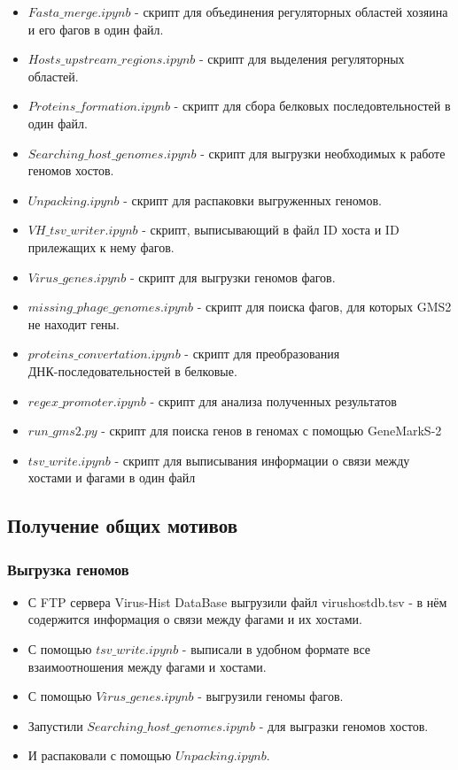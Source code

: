 \documentclass[14pt]{extarticle}
\begin{document}
\begin{itemize}
    \item \(Fasta\_merge.ipynb\) - скрипт для объединения регуляторных областей хозяина и его фагов в один файл.
    \item \(Hosts\_upstream\_regions.ipynb\) - скрипт для выделения регуляторных областей.
    \item \(Proteins\_formation.ipynb\) - скрипт для сбора белковых последовтельностей в один файл.
    \item \(Searching\_host\_genomes.ipynb\) - скрипт для выгрузки необходимых к работе геномов хостов.
    \item \(Unpacking.ipynb\) - скрипт для распаковки выгруженных геномов.
    \item \(VH\_tsv\_writer.ipynb\) - скрипт, выписывающий в файл ID хоста и ID прилежащих к нему фагов.
    \item \(Virus\_genes.ipynb\) - скрипт для выгрузки геномов фагов.
    \item \(missing\_phage\_genomes.ipynb\) - скрипт для поиска фагов, для которых GMS2 не находит гены.
    \item \(proteins\_convertation.ipynb \) - скрипт для преобразования \\ ДНК-последовательностей
                                в белковые.
    \item \(regex\_promoter.ipynb \) - скрипт для анализа полученных результатов
    \item \(run\_gms2.py\) - скрипт для поиска генов в геномах с помощью GeneMarkS-2
    \item \(tsv\_write.ipynb\) - скрипт для выписывания информации о связи между хостами и фагами в один файл
\end{itemize}

\begin{center}
      \item \subsection{Получение общих мотивов}
      \item  \subsubsection{Выгрузка геномов}
\end{center}
    \begin{itemize}
        \item С FTP сервера Virus-Hist DataBase выгрузили файл virushostdb.tsv - в нём содержится информация о связи 
        между фагами и их хостами.
        \item С помощью \(tsv\_write.ipynb\) - выписали в удобном формате все взаимоотношения между фагами и 
        хостами.
        \item С помощью \(Virus\_genes.ipynb\) - выгрузили геномы фагов.
        \item Запустили \(Searching\_host\_genomes.ipynb\) - для выгразки геномов хостов.
        \item И распаковали с помощью \(Unpacking.ipynb\).
    \end{itemize}
    
\end{document}
